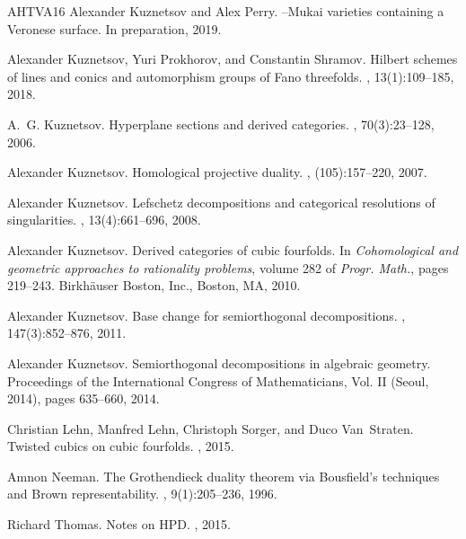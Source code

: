 \documentclass[11pt]{amsart}
\theoremstyle{plain}
\theoremstyle{definition}
\theoremstyle{remark}
\begin{document}
\begin{thebibliography}{AHTVA16}
Alexander Kuznetsov and Alex Perry.
--{Mukai} varieties containing a {Veronese} surface.
\newblock In preparation, 2019.

Alexander Kuznetsov, Yuri Prokhorov, and Constantin Shramov.
\newblock Hilbert schemes of lines and conics and automorphism groups of {F}ano
  threefolds.
, 13(1):109--185, 2018.

A.~G. Kuznetsov.
\newblock Hyperplane sections and derived categories.
, 70(3):23--128, 2006.

Alexander Kuznetsov.
\newblock Homological projective duality.
, (105):157--220, 2007.

Alexander Kuznetsov.
\newblock Lefschetz decompositions and categorical resolutions of
  singularities.
, 13(4):661--696, 2008.

Alexander Kuznetsov.
\newblock Derived categories of cubic fourfolds.
\newblock In {\em Cohomological and geometric approaches to rationality
  problems}, volume 282 of {\em Progr. Math.}, pages 219--243. Birkh\"auser
  Boston, Inc., Boston, MA, 2010.

Alexander Kuznetsov.
\newblock Base change for semiorthogonal decompositions.
, 147(3):852--876, 2011.

Alexander Kuznetsov.
\newblock Semiorthogonal decompositions in algebraic geometry.
\newblock Proceedings of the {I}nternational {C}ongress of {M}athematicians,
  {V}ol. {II} ({S}eoul, 2014), pages 635--660, 2014.

Christian Lehn, Manfred Lehn, Christoph Sorger, and Duco Van~Straten.
\newblock Twisted cubics on cubic fourfolds.
, 2015.

Amnon Neeman.
\newblock The {G}rothendieck duality theorem via {B}ousfield's techniques and
  {B}rown representability.
, 9(1):205--236, 1996.

Richard Thomas.
\newblock Notes on {HPD}.
, 2015.

\end{thebibliography}
\end{document}
